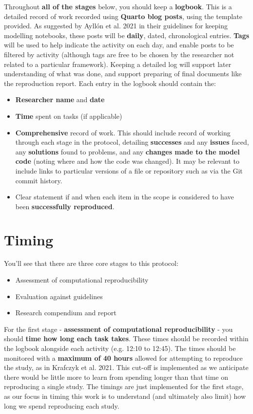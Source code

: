 Throughout \textbf{all of the stages} below, you should keep a \textbf{logbook}. This is a detailed record of work recorded using \textbf{Quarto blog posts}, using the template provided. As suggested by Ayllón et al. 2021\autocite{ayllon_keeping_2021} in their guidelines for keeping modelling notebooks, these posts will be \textbf{daily}, dated, chronological entries. \textbf{Tags} will be used to help indicate the activity on each day, and enable posts to be filtered by activity (although tags are free to be chosen by the researcher not related to a particular framework). Keeping a detailed log will support later understanding of what was done, and support preparing of final documents like the reproduction report. Each entry in the logbook should contain the:
\begin{itemize}
    \item \textbf{Researcher name} and \textbf{date}
    \item \textbf{Time} spent on tasks (if applicable)
    \item \textbf{Comprehensive} record of work. This should include record of working through each stage in the protocol, detailing \textbf{successes} and any \textbf{issues} faced, any \textbf{solutions} found to problems, and any \textbf{changes made to the model code} (noting where and how the code was changed). It may be relevant to include links to particular versions of a file or repository such as via the Git commit history.
    \item Clear statement if and when each item in the scope is considered to have been \textbf{successfully reproduced}.
\end{itemize}

\vspace{1cm}
\section{Timing}

You'll see that there are three core stages to this protocol:
\begin{itemize}
    \item Assessment of computational reproducibility
    \item Evaluation against guidelines
    \item Research compendium and report
\end{itemize}

For the first stage - \textbf{assessment of computational reproducibility} - you should \textbf{time how long each task takes}. These times should be recorded within the logbook alongside each activity (e.g. 12:10 to 12:45). The times should be monitored with a \textbf{maximum of 40 hours} allowed for attempting to reproduce the study, as in Krafczyk et al. 2021.\autocite{krafczyk_learning_2021} This cut-off is implemented as we anticipate there would be little more to learn from spending longer than that time on reproducing a single study. The timings are just implemented for the first stage, as our focus in timing this work is to understand (and ultimately also limit) how long we spend reproducing each study.

